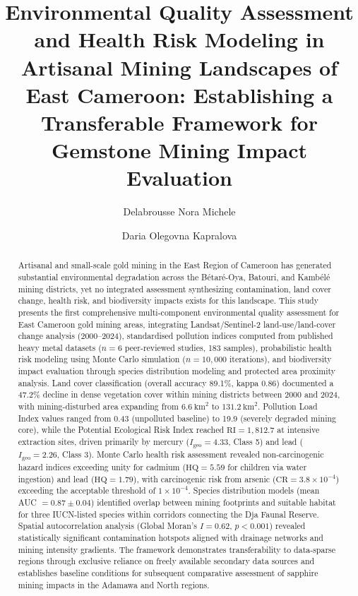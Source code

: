 \documentclass[preprint,12pt,authoryear]{elsarticle}
\begin{document}
\begin{frontmatter}

\title{Environmental Quality Assessment and Health Risk Modeling in Artisanal Mining Landscapes of East Cameroon: Establishing a Transferable Framework for Gemstone Mining Impact Evaluation}

\author[1]{Delabrousse Nora Michele}
\author[2]{Daria Olegovna Kapralova}


\address[1]{Department of Environmental Sciences, University of Yaound\'{e} I, Yaound\'{e}, Cameroon}
\address[2]{Faculty of Geography, Lomonosov Moscow State University, Moscow, Russia}

\begin{abstract}
Artisanal and small-scale gold mining in the East Region of Cameroon has generated substantial environmental degradation across the B\'{e}tar\'{e}-Oya, Batouri, and Kamb\'{e}l\'{e} mining districts, yet no integrated assessment synthesizing contamination, land cover change, health risk, and biodiversity impacts exists for this landscape. This study presents the first comprehensive multi-component environmental quality assessment for East Cameroon gold mining areas, integrating Landsat/Sentinel-2 land-use/land-cover change analysis (2000--2024), standardised pollution indices computed from published heavy metal datasets ($n = 6$ peer-reviewed studies, 183 samples), probabilistic health risk modeling using Monte Carlo simulation ($n = 10{,}000$ iterations), and biodiversity impact evaluation through species distribution modeling and protected area proximity analysis. Land cover classification (overall accuracy 89.1\%, kappa 0.86) documented a 47.2\% decline in dense vegetation cover within mining districts between 2000 and 2024, with mining-disturbed area expanding from $6.6~\text{km}^{2}$ to $131.2~\text{km}^{2}$. Pollution Load Index values ranged from 0.43 (unpolluted baseline) to 19.9 (severely degraded mining core), while the Potential Ecological Risk Index reached $\text{RI} = 1{,}812.7$ at intensive extraction sites, driven primarily by mercury ($I_\text{geo} = 4.33$, Class 5) and lead ($I_\text{geo} = 2.26$, Class 3). Monte Carlo health risk assessment revealed non-carcinogenic hazard indices exceeding unity for cadmium ($\text{HQ} = 5.59$ for children via water ingestion) and lead ($\text{HQ} = 1.79$), with carcinogenic risk from arsenic ($\text{CR} = 3.8 \times 10^{-4}$) exceeding the acceptable threshold of $1 \times 10^{-4}$. Species distribution models (mean AUC $= 0.87 \pm 0.04$) identified overlap between mining footprints and suitable habitat for three IUCN-listed species within corridors connecting the Dja Faunal Reserve. Spatial autocorrelation analysis (Global Moran's $I = 0.62$, $p < 0.001$) revealed statistically significant contamination hotspots aligned with drainage networks and mining intensity gradients. The framework demonstrates transferability to data-sparse regions through exclusive reliance on freely available secondary data sources and establishes baseline conditions for subsequent comparative assessment of sapphire mining impacts in the Adamawa and North regions.

\end{abstract}
\end{frontmatter}
\end{document}
